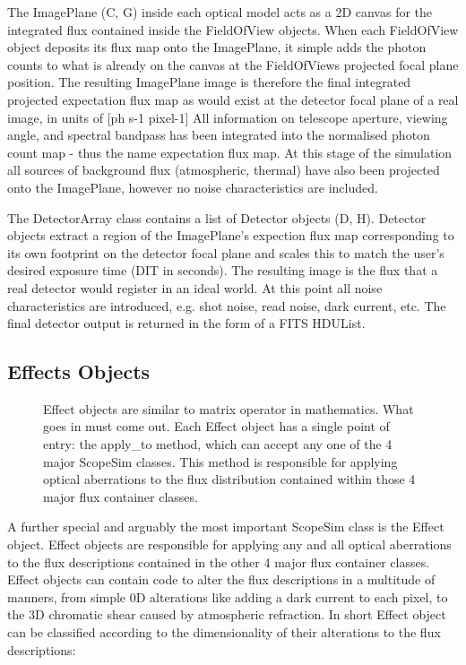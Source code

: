 The ImagePlane (C, G) inside each optical model acts as a 2D canvas for the integrated flux contained inside the FieldOfView objects.
When each FieldOfView object deposits its flux map onto the ImagePlane, it simple adds the photon counts to what is already on the canvas at the FieldOfViews projected focal plane position.
The resulting ImagePlane image is therefore the final integrated projected expectation flux map as would exist at the detector focal plane of a real image, in units of {[}ph s-1 pixel-1{]}
All information on telescope aperture, viewing angle, and spectral bandpass has been integrated into the normalised photon count map - thus the name \textquotedbl{}expectation\textquotedbl{} flux map.
At this stage of the simulation all sources of background flux (atmospheric, thermal) have also been projected onto the ImagePlane, however no noise characteristics are included.

The DetectorArray class contains a list of Detector objects (D, H).
Detector objects extract a region of the ImagePlane's expection flux map corresponding to its own footprint on the detector focal plane and scales this to match the user's desired exposure time (DIT in seconds).
The resulting image is the flux that a real detector would register in an ideal world.
At this point all noise characteristics are introduced, e.g. shot noise, read noise, dark current, etc.
The final detector output is returned in the form of a FITS HDUList.


\subsection{Effects Objects%
  \label{effects-objects}%
}

\begin{figure}[H]
\noindent{}\label{fig-effect}

\caption{Effect objects are similar to matrix operator in mathematics.
What goes in must come out.
Each Effect object has a single point of entry: the \textquotedbl{}apply\_to\textquotedbl{} method, which can accept any one of the 4 major ScopeSim classes.
This method is responsible for applying optical aberrations to the flux distribution contained within those 4 major flux container classes.}
\end{figure}

A further special and arguably the most important ScopeSim class is the Effect object.
Effect objects are responsible for applying any and all optical aberrations to the flux descriptions contained in the other 4 major flux container classes.
Effect objects can contain code to alter the flux descriptions in a multitude of manners, from simple 0D alterations like adding a dark current to each pixel, to the 3D chromatic shear caused by atmospheric refraction.
In short Effect object can be classified according to the dimensionality of their alterations to the flux descriptions:

